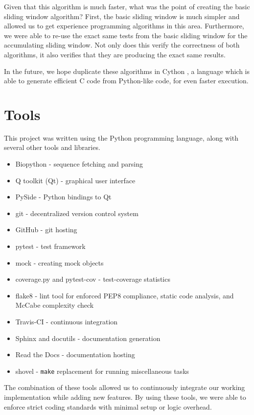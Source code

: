 \documentclass{bioinfo}
\begin{document}
Given that this algorithm is much faster, what was the point of
creating the basic sliding window algorithm? First, the basic sliding
window is much simpler and allowed us to get experience programming
algorithms in this area. Furthermore, we were able to re-use the exact
same tests from the basic sliding window for the accumulating sliding
window. Not only does this verify the correctness of both algorithms,
it also verifies that they are producing the exact same results.

In the future, we hope duplicate these algorithms in Cython
\citep{behnel2010cython}, a language which is able to generate
efficient C code from Python-like code, for even faster execution.

\section{Tools}

This project was written using the Python programming language, along
with several other tools and libraries.

\begin{itemize}
\item Biopython - sequence fetching and parsing
\item Q toolkit (Qt) - graphical user interface
\item PySide - Python bindings to Qt
\item git - decentralized version control system
\item GitHub - git hosting
\item pytest - test framework
\item mock - creating mock objects
\item coverage.py and pytest-cov - test-coverage statistics
\item flake8 - lint tool for enforced PEP8 compliance, static code
  analysis, and McCabe complexity check
\item Travis-CI - continuous integration
\item Sphinx and docutils - documentation generation
\item Read the Docs - documentation hosting
\item shovel - \texttt{make} replacement for running miscellaneous tasks
\end{itemize}

The combination of these tools allowed us to continuously integrate
our working implementation while adding new features. By using these
tools, we were able to enforce strict coding standards with minimal
setup or logic overhead.
\end{document}
